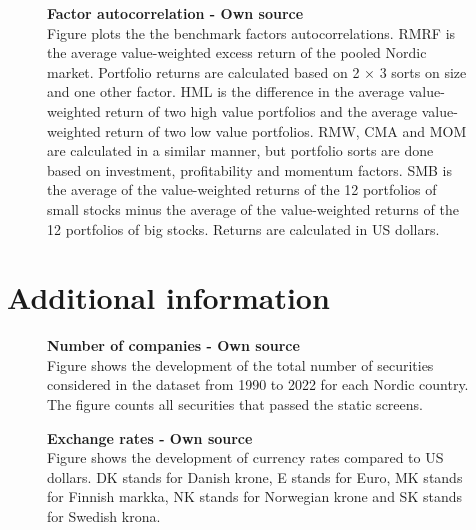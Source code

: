 \documentclass[12pt]{article}
\begin{document}
\begin{appendices}
\begin{figure}[H]
\centering
\caption[Factor autocorrelation]{\textbf{Factor autocorrelation \textnormal{- Own source}}\\ Figure plots the the benchmark factors autocorrelations. RMRF is the average value-weighted excess return of the pooled Nordic market. Portfolio returns are calculated based on 2 × 3 sorts on size and one other factor. HML is the difference in the average value-weighted return of two high value portfolios and the average value-weighted return of two low value portfolios. RMW, CMA and MOM are calculated in a similar manner, but portfolio sorts are done based on investment, profitability and momentum factors. SMB is the average of the value-weighted returns of the 12 portfolios of small stocks minus the average of the value-weighted returns of the 12 portfolios of big stocks. Returns are calculated in US dollars.}

\label{plot:factor_autocorrelation}
\end{figure}

\clearpage

\section{Additional information}
\renewcommand{\thefigure}{C.\arabic{figure}}
\setcounter{figure}{0}
\renewcommand{\thetable}{C.\arabic{table}}
\setcounter{table}{0}

\begin{figure}[H]
\centering
\caption[Number of companies]{\textbf{Number of companies \textnormal{- Own source}}\\ Figure shows the development of the total number of securities considered in the dataset from 1990 to 2022 for each Nordic country. The figure counts all securities that passed the static screens.}

\label{plot:number_of_companies}
\end{figure}

\begin{figure}[H]
\centering
\caption[Exchange rates]{\textbf{Exchange rates \textnormal{- Own source}}\\ Figure shows the development of currency rates compared to US dollars. DK stands for  Danish krone, E stands for Euro, MK stands for Finnish markka, NK stands for Norwegian krone and SK stands for Swedish krona.}

\label{plot:fx_rates}
\end{figure}


\end{appendices}
\end{document}
